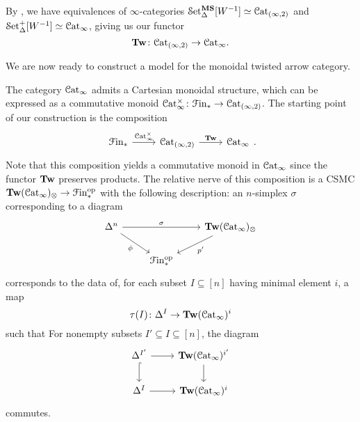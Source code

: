 \documentclass[main.tex]{subfiles}
\begin{document}
By \cite[Example~1.3.4.8]{luriehigheralgebra}, we have equivalences of $\infty$-categories $\mathcal{S}\mathrm{et}_{\Delta}^{\mathbf{MS}}[W^{-1}] \simeq \mathcal{C}\mathrm{at}_{(\infty,2)}$ and $\mathcal{S}\mathrm{et}_{\Delta}^{+}[W^{-1}] \simeq \mathcal{C}\mathrm{at}_{\infty}$, giving us our functor
\begin{equation*}
  \mathbf{Tw}\colon \mathcal{C}\mathrm{at}_{(\infty,2)} \to \mathcal{C}\mathrm{at}_{\infty}.
\end{equation*}

We are now ready to construct a model for the monoidal twisted arrow category.

\begin{construction}
  The category $\mathcal{C}\mathrm{at}_{\infty}$ admits a Cartesian monoidal structure, which can be expressed as a commutative monoid $\mathcal{C}\mathrm{at}_{\infty}^{\times}\colon \mathcal{F}\mathrm{in}_{*} \to \mathcal{C}\mathrm{at}_{(\infty,2)}$. The starting point of our construction is the composition
  \begin{equation*}
    \begin{tikzcd}
      \Finp
      \arrow[r, "\ICat^{\times}"]
      & \Cat_{(\infty, 2)}
      \arrow[r, "\Tw"]
      & \ICat
    \end{tikzcd}.
  \end{equation*}
  Note that this composition yields a commutative monoid in $\mathcal{C}\mathrm{at}_{\infty}$ since the functor $\mathbf{Tw}$ preserves products. The relative nerve of this composition is a CSMC $\mathbf{Tw}(\mathcal{C}\mathrm{at}_{\infty})_{\otimes} \to \mathcal{F}\mathrm{in}_{*}^{\mathrm{op}}$ with the following description: an $n$-simplex $\sigma$ corresponding to a diagram
  \begin{equation*}
    \begin{tikzcd}
      \Delta^{n}
      \arrow[rr, "\sigma"]
      \arrow[dr, swap, "\phi"]
      && \Tw(\ICat)_{\otimes}
      \arrow[dl, "p'"]
      \\
      & \Finp\op
    \end{tikzcd}
  \end{equation*}
  corresponds to the data of, for each subset $I \subseteq [n]$ having minimal element $i$, a map
  \begin{equation*}
    \tau(I)\colon \Delta^{I} \to \mathbf{Tw}(\mathcal{C}\mathrm{at}_{\infty})^{i}
  \end{equation*}
  such that For nonempty subsets $I' \subseteq I \subseteq [n]$, the diagram
  \begin{equation*}
    \begin{tikzcd}
      \Delta^{I'}
      \arrow[r]
      \arrow[d, hook]
      & \Tw(\ICat)^{i'}
      \arrow[d]
      \\
      \Delta^{I}
      \arrow[r]
      & \Tw(\ICat)^{i}
    \end{tikzcd}
  \end{equation*}
  commutes.
\end{construction}
\end{document}
